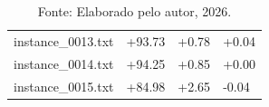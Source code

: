 \begin{table}[H]
\begin{minipage}{\textwidth}
{\begin{tabular}{l | l | l | l}
        instance\_0013.txt & \textcolor{green!50!black}{+93.73} & \textcolor{green!50!black}{+0.78} & \textcolor{green!50!black}{+0.04} \\
        \rowcolor{gray!20} instance\_0014.txt & \textcolor{green!50!black}{+94.25} & \textcolor{green!50!black}{+0.85} & +0.00 \\
        instance\_0015.txt & \textcolor{green!50!black}{+84.98} & \textcolor{green!50!black}{+2.65} & \textcolor{red!80!black}{-0.04} \\
        \hline
      \end{tabular}
    }
    \caption*{\footnotesize Fonte: Elaborado pelo autor, 2026.}
  \end{minipage}
\end{table}
